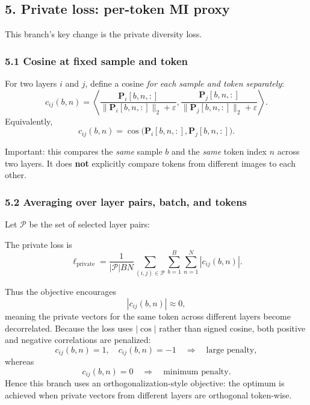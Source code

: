 \documentclass[11pt]{article}
\begin{document}
\subsection*{5. Private loss: per-token MI proxy}
This branch's key change is the private diversity loss.

\subsubsection*{5.1 Cosine at fixed sample and token}
For two layers $i$ and $j$, define a cosine \emph{for each sample and token separately}:
\[
  c_{ij}(b,n)
  =
  \left\langle
    \frac{\bm{P}_i[b,n,:]}{\|\bm{P}_i[b,n,:]\|_2+\varepsilon},
    \frac{\bm{P}_j[b,n,:]}{\|\bm{P}_j[b,n,:]\|_2+\varepsilon}
  \right\rangle.
\]
Equivalently,
\[
  c_{ij}(b,n)=\cos\big(\bm{P}_i[b,n,:],\bm{P}_j[b,n,:]\big).
\]

Important: this compares the \emph{same} sample $b$ and the \emph{same} token index $n$ across two layers. It does \textbf{not} explicitly compare tokens from different images to each other.

\subsubsection*{5.2 Averaging over layer pairs, batch, and tokens}
Let $\mathcal{P}$ be the set of selected layer pairs:

The private loss is
\[
  \ell_{\mathrm{private}}
  =
  \frac{1}{|\mathcal{P}|BN}
  \sum_{(i,j)\in\mathcal{P}}
  \sum_{b=1}^{B}
  \sum_{n=1}^{N}
  \left|c_{ij}(b,n)\right|.
\]

Thus the objective encourages
\[
  \left|c_{ij}(b,n)\right| \approx 0,
\]
meaning the private vectors for the same token across different layers become decorrelated. Because the loss uses $\lvert \cos \rvert$ rather than signed cosine, both positive and negative correlations are penalized:
\[
  c_{ij}(b,n)=1,\quad c_{ij}(b,n)=-1
  \quad \Longrightarrow \quad
  \text{large penalty},
\]
whereas
\[
  c_{ij}(b,n)=0
  \quad \Longrightarrow \quad
  \text{minimum penalty}.
\]
Hence this branch uses an orthogonalization-style objective: the optimum is achieved when private vectors from different layers are orthogonal token-wise.
\end{document}
